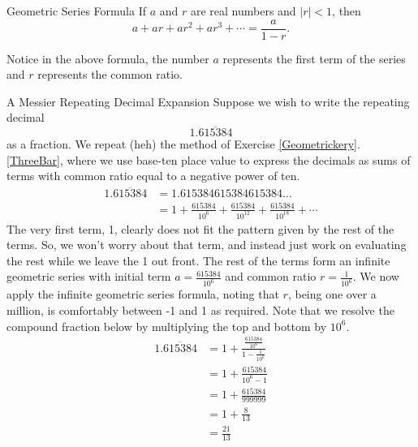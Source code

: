 \begin{theorem}{ Geometric Series Formula }
If $a$ and $r$ are real numbers and $|r|<1$, then $$a+ar+ar^2+ar^3+\cdots=\frac{a}{1-r}.$$  
\end{theorem}

Notice in the above formula, the number $a$ represents the first term of the series and $r$ represents the common ratio.

\begin{example}{A Messier Repeating Decimal Expansion}
Suppose we wish to write the repeating decimal $$1.\overline{615384} $$ as a fraction. We repeat (heh) the method of Exercise \ref{Geometrickery}.\ref{ThreeBar}, where we use base-ten place value to express the decimals as sums of terms with common ratio equal to a negative power of ten.
\begin{align*}
1.\overline{615384}&=1.615384615384615384\ldots \\
&=1+\frac{615384}{10^6}+\frac{615384}{10^{12}}+\frac{615384}{10^{18}}+\cdots
\end{align*}
The very first term, 1, clearly does not fit the pattern given by the rest of the terms.  So, we won't worry about that term, and instead just work on evaluating the rest while we leave the 1 out front.  The rest of the terms form an infinite geometric series with initial term $a=\frac{615384}{10^{6}}$ and common ratio $r=\frac{1}{10^6}$.  We now apply the infinite geometric series formula, noting that $r$, being one over a million, is comfortably between -1 and 1 as required.  Note that we resolve the compound fraction below by multiplying the top and bottom by $10^6$.
\begin{align*}
1.\overline{615384}
&=1+\frac{\frac{615384}{10^6}}{1-\frac{1}{10^6}} \\
&=1+\frac{615384}{10^6-1}\\
&=1+\frac{615384}{999999}\\
&=1+\frac{8}{13}\\
&=\frac{21}{13}\\
\end{align*}
\end{example}

